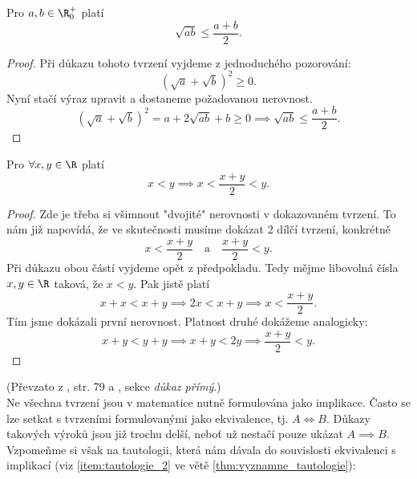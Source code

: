 \begin{proposition}[AG nerovnost]
    Pro $a,b\in\R_0^+$ platí
    \begin{equation*}
        \sqrt{ab}\leq\dfrac{a+b}{2}.
    \end{equation*}
\end{proposition}
\begin{proof}
    Při důkazu tohoto tvrzení vyjdeme z jednoduchého pozorování:
    \begin{equation*}
        (\sqrt{a}+\sqrt{b})^2\geq 0.
    \end{equation*}
    Nyní stačí výraz upravit a dostaneme požadovanou nerovnost.
    \begin{equation*}
        (\sqrt{a}+\sqrt{b})^2 = a+2\sqrt{ab}+b\geq 0 \implies \sqrt{ab}\leq \dfrac{a+b}{2}.
    \end{equation*}
\end{proof}
\begin{proposition}
    Pro $\forall x,y\in\R$ platí
    \begin{equation*}
        x<y \implies x<\dfrac{x+y}{2}<y.
    \end{equation*}
\end{proposition}
\begin{proof}
    Zde je třeba si všimnout "dvojité" nerovnosti v dokazovaném tvrzení. To nám již napovídá, že ve skutečnosti musíme dokázat 2 dílčí tvrzení, konkrétně
    \begin{equation*}
        x < \dfrac{x+y}{2}\quad\text{a}\quad\dfrac{x+y}{2} < y.
    \end{equation*}
    Při důkazu obou částí vyjdeme opět z předpokladu. Tedy mějme libovolná čísla $x,y\in\R$ taková, že $x<y$. Pak jistě platí
    \begin{equation*}
        x+x<x+y \implies 2x<x+y \implies x<\dfrac{x+y}{2}.
    \end{equation*}
    Tím jsme dokázali první nerovnost. Platnost druhé dokážeme analogicky:
    \begin{equation*}
        x+y<y+y \implies x+y<2y \implies \dfrac{x+y}{2}<y.
    \end{equation*}
\end{proof}
(Převzato z \cite{ChartrandPolimeniZhang2014}, str. 79 a \cite{MatematickaLogikaUK2010}, sekce \emph{důkaz přímý}.)\\
Ne všechna tvrzení jsou v matematice nutně formulována jako implikace. Často se lze setkat s tvrzeními formulovanými jako ekvivalence, tj. $A \iff B$. Důkazy takových výroků jsou již trochu delší, neboť už nestačí pouze ukázat $A \implies B$. Vzpomeňme si však na tautologii, která nám dávala do souvislosti ekvivalenci s implikací (viz \ref{item:tautologie_2} ve větě \ref{thm:vyznamne_tautologie}):
